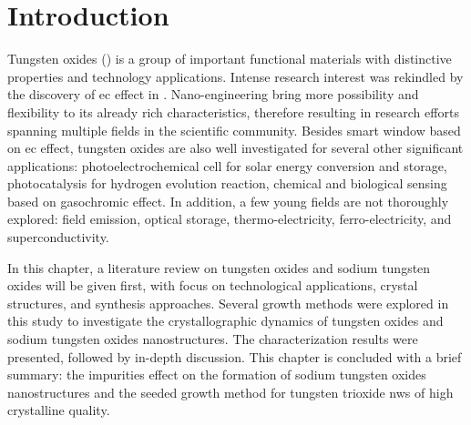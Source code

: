 
\section{Introduction}
Tungsten oxides () is a group of important functional materials with distinctive properties and technology applications. Intense research interest was rekindled by the discovery of \gls{ec} effect in \citeyear{Granqvist1993}.\cite{Granqvist1993}  Nano-engineering  bring more possibility and flexibility to its already rich characteristics, therefore resulting in research efforts spanning multiple fields in the scientific community. Besides smart window based on \gls{ec} effect, tungsten oxides are also well investigated for several other significant applications: photoelectrochemical cell for solar energy conversion and storage, photocatalysis for hydrogen evolution reaction, chemical and biological sensing based on gasochromic effect. In addition, a few young fields are not thoroughly explored: field emission, optical storage, thermo-electricity, ferro-electricity, and superconductivity.

In this chapter, a literature review on tungsten oxides and sodium tungsten oxides will be given first, with focus on technological applications, crystal structures, and synthesis approaches. Several growth methods were explored in this study to investigate the crystallographic dynamics of tungsten oxides and sodium tungsten oxides nanostructures. The characterization results were presented, followed by in-depth discussion. This chapter is concluded with a brief summary: the impurities effect on the formation of sodium tungsten oxides nanostructures and the seeded growth method for tungsten trioxide \glspl{nw} of high crystalline quality.

